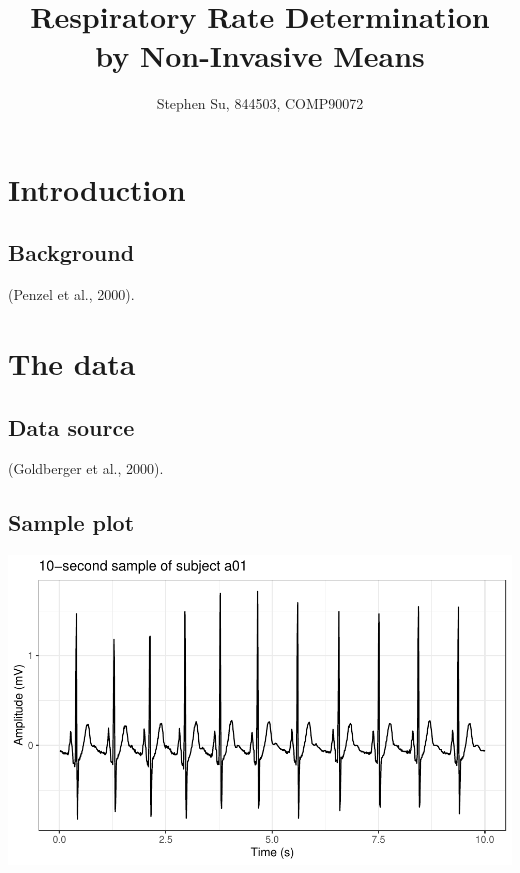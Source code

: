 \documentclass[
]{article}
\title{Respiratory Rate Determination by Non-Invasive Means}
\author{Stephen Su, 844503, COMP90072}
\date{}
\begin{document}
\maketitle

\hypertarget{introduction}{%
\section{Introduction}\label{introduction}}

\hypertarget{background}{%
\subsection{Background}\label{background}}

(Penzel et al., 2000).

\hypertarget{the-data}{%
\section{The data}\label{the-data}}

\hypertarget{data-source}{%
\subsection{Data source}\label{data-source}}

(Goldberger et al., 2000).

\hypertarget{sample-plot}{%
\subsection{Sample plot}\label{sample-plot}}

\begin{center}\includegraphics{report_files/figure-latex/rr-interval-1} \end{center}
\end{document}
